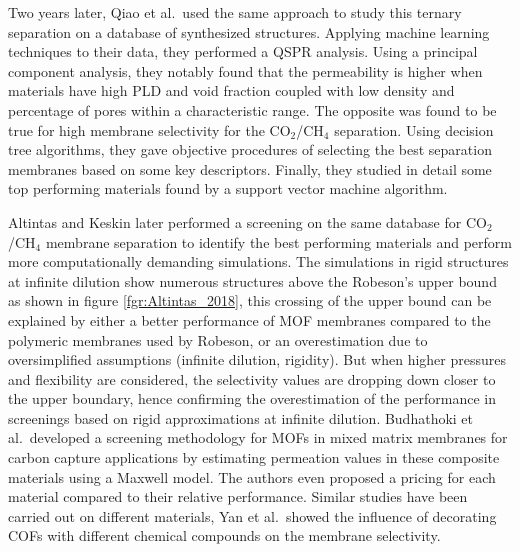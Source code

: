 \documentclass[main.tex]{subfiles}
\begin{document}
Two years later, Qiao et al.\ used the same approach to study this ternary separation on a database of synthesized structures.\cite{Qiao_2018} Applying machine learning techniques to their data, they performed a QSPR analysis. Using a principal component analysis, they notably found that the permeability is higher when materials have high PLD and void fraction coupled with low density and percentage of pores within a characteristic range. The opposite was found to be true for high membrane selectivity for the CO$_2$/CH$_4$ separation. Using decision tree algorithms, they gave objective procedures of selecting the best separation membranes based on some key descriptors. Finally, they studied in detail some top performing materials found by a support vector machine algorithm.

Altintas and Keskin later performed a screening on the same database for CO$_2$/CH$_4$ membrane separation to identify the best performing materials and perform more computationally demanding simulations.\cite{Altintas_2018} {The simulations in rigid structures at infinite dilution show numerous structures above the Robeson's upper bound as shown in figure \ref{fgr:Altintas_2018}, this crossing of the upper bound can be explained by either a better performance of MOF membranes compared to the polymeric membranes used by Robeson, or an overestimation due to oversimplified assumptions (infinite dilution, rigidity). But when higher pressures and flexibility are considered, the selectivity values are dropping down closer to the upper boundary}, hence confirming the overestimation of the performance in screenings {based on rigid approximations at infinite dilution}.  Budhathoki et al.\ developed a screening methodology for MOFs in mixed matrix membranes for carbon capture applications by estimating permeation values in these composite materials using a Maxwell model.\cite{Budhathoki_2019} The authors even proposed a pricing for each material compared to their relative performance. Similar studies have been carried out on different materials, Yan et al.\ showed the influence of decorating COFs with different chemical compounds on the membrane selectivity.\cite{Yan_2018}
\end{document}
